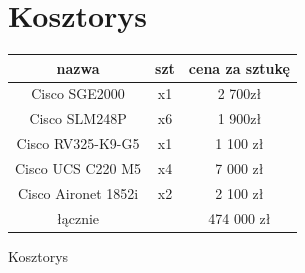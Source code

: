 \documentclass{article}
\begin{document}
\section{Kosztorys}
\begin{Tabela}[!ht]
	\centering
\begin{tabular}{c|c|c}
	nazwa&szt&cena za sztukę\\
	\hline
	Cisco SGE2000&x1&2 700zł\\
	Cisco SLM248P&x6&1 900zł\\
	Cisco RV325-K9-G5& x1& 1 100 zł\\
	Cisco UCS C220 M5& x4& 7 000 zł\\
	Cisco Aironet 1852i& x2& 2 100 zł\\
	\hline
	\hline
	łącznie &&474 000 zł\\
\end{tabular}
\caption{Kosztorys}
\end{Tabela}
\end{document}
